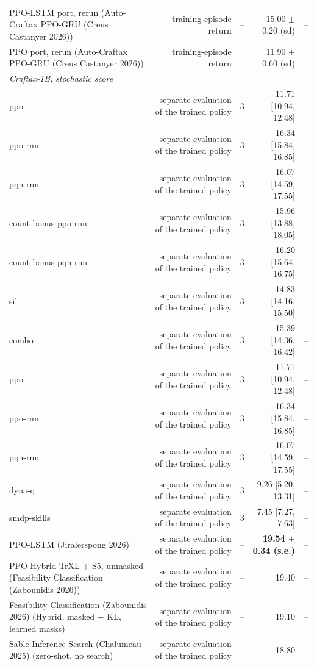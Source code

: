 \begin{tabular}{lrrrr}
PPO-LSTM port, rerun (Auto-Craftax PPO-GRU (Creus Castanyer 2026)) & training-episode return & -- & 15.00 $\pm$ 0.20 (sd) & -- \\
PPO port, rerun (Auto-Craftax PPO-GRU (Creus Castanyer 2026)) & training-episode return & -- & 11.90 $\pm$ 0.60 (sd) & -- \\
\midrule
\multicolumn{5}{l}{\emph{Craftax-1B, stochastic score}} \\
ppo & separate evaluation of the trained policy & 3 & 11.71 [10.94, 12.48] & -- \\
ppo-rnn & separate evaluation of the trained policy & 3 & 16.34 [15.84, 16.85] & -- \\
pqn-rnn & separate evaluation of the trained policy & 3 & 16.07 [14.59, 17.55] & -- \\
count-bonus-ppo-rnn & separate evaluation of the trained policy & 3 & 15.96 [13.88, 18.05] & -- \\
count-bonus-pqn-rnn & separate evaluation of the trained policy & 3 & 16.20 [15.64, 16.75] & -- \\
sil & separate evaluation of the trained policy & 3 & 14.83 [14.16, 15.50] & -- \\
combo & separate evaluation of the trained policy & 3 & 15.39 [14.36, 16.42] & -- \\
ppo & separate evaluation of the trained policy & 3 & 11.71 [10.94, 12.48] & -- \\
ppo-rnn & separate evaluation of the trained policy & 3 & 16.34 [15.84, 16.85] & -- \\
pqn-rnn & separate evaluation of the trained policy & 3 & 16.07 [14.59, 17.55] & -- \\
dyna-q & separate evaluation of the trained policy & 3 & 9.26 [5.20, 13.31] & -- \\
smdp-skills & separate evaluation of the trained policy & 3 & 7.45 [7.27, 7.63] & -- \\
PPO-LSTM (Jiralerspong 2026) & separate evaluation of the trained policy & -- & \textbf{19.54 $\pm$ 0.34 (s.e.)} & -- \\
PPO-Hybrid TrXL + S5, unmasked (Feasibility Classification (Zabounidis 2026)) & separate evaluation of the trained policy & -- & 19.40 & -- \\
Feasibility Classification (Zabounidis 2026) (Hybrid, masked + KL, learned masks) & separate evaluation of the trained policy & -- & 19.10 & -- \\
Sable Inference Search (Chalumeau 2025) (zero-shot, no search) & separate evaluation of the trained policy & -- & 18.80 & -- \\

\end{tabular}
